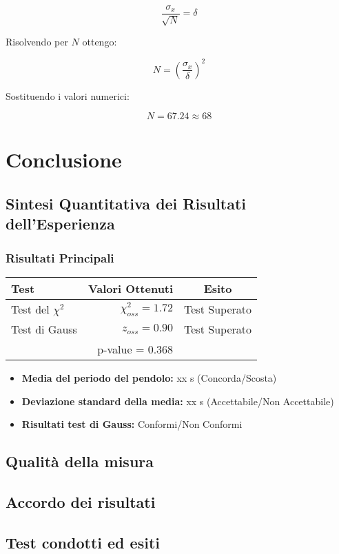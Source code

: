 \documentclass{article}
\begin{document}
\[\frac{\sigma_x}{\sqrt{N}} = \delta\]

\noindent Risolvendo per $N$ ottengo:

\[N = \left( \frac{\sigma_x}{\delta} \right)^2\]

\noindent Sostituendo i valori numerici:

\[N = 67.24 \approx 68 \]

\section{Conclusione}
\subsection{Sintesi Quantitativa dei Risultati dell'Esperienza}
\subsubsection{Risultati Principali}

\begin{table}[ht]
	\centering
	\begin{tabular}{|l|r|c|}
		\hline
		\textbf{Test} & \textbf{Valori Ottenuti} & \textbf{Esito}  \\
		\hline
		Test del $\chi^2$ & $\chi^2_{oss} = 1.72$  &  Test Superato \\
		\hline
		Test di Gauss & $z_{oss} = 0.90$ & Test Superato \\
		& p-value = 0.368 &   \\
		\hline
	\end{tabular}
	\label{tab:sintesi_quantitativa}
\end{table}

\begin{itemize}
	\item \textbf{Media del periodo del pendolo:} xx s (Concorda/Scosta)
	\item \textbf{Deviazione standard della media:} xx s (Accettabile/Non Accettabile)
	\item \textbf{Risultati test di Gauss:} Conformi/Non Conformi
\end{itemize}

\subsection{Qualità della misura}

\subsection{Accordo dei risultati}

\subsection{Test condotti ed esiti}
\end{document}
